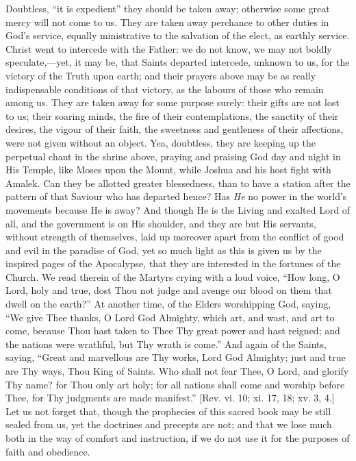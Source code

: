 Doubtless, ``it is expedient'' they should be taken away;
otherwise some great mercy will not come to us. They are taken away
perchance to other duties in God's service, equally ministrative to the
salvation of the elect, as earthly service. Christ went to intercede
with the Father: we do not know, we may not boldly speculate,—yet, it
may be, that Saints departed intercede, unknown to us, for the victory
of the Truth upon earth; and their prayers above may be as really
indispensable conditions of that victory, as the labours of those who
remain among us. They are taken away for some purpose surely: their
gifts are not lost to us; their soaring minds, the fire of their
contemplations, the sanctity of their desires, the vigour of their
faith, the sweetness and gentleness of their affections, were not given
without an object. Yea, doubtless, they are keeping up the perpetual
chant in the shrine above, praying and praising God day and night in His
Temple, like Moses upon the Mount, while Joshua and his host fight with
Amalek. Can they be allotted greater blessedness, than to have a station
after the pattern of that Saviour who has departed hence? Has \emph{He}
no power in the world's movements because He is away? And though He is
the Living and exalted Lord of all, and the government is on His
shoulder, and they are but His servants, without strength of themselves,
laid up moreover apart from the conflict of good and evil in the
paradise of God, yet so much light as this is given us by the inspired
pages of the Apocalypse, that they are interested in the fortunes of the
Church. We read therein of the Martyrs crying with a loud voice,
``How long, O Lord, holy and true, dost Thou not judge and avenge
our blood on them that dwell on the earth?'' At another time, of the
Elders worshipping God, saying, ``We give Thee thanks, O Lord God
Almighty, which art, and wast, and art to come, because Thou hast taken
to Thee Thy great power and hast reigned; and the nations were wrathful,
but Thy wrath is come.'' And again of the Saints, saying,
``Great and marvellous are Thy works, Lord God Almighty; just and
true are Thy ways, Thou King of Saints. Who shall not fear Thee, O Lord,
and glorify Thy name? for Thou only art holy; for all nations shall come
and worship before Thee, for Thy judgments are made manifest.''
[Rev. vi. 10; xi. 17, 18; xv. 3, 4.] Let us not forget that, though the
prophecies of this sacred book may be still sealed from us, yet the
doctrines and precepts are not; and that we lose much both in the way of
comfort and instruction, if we do not use it for the purposes of faith
and obedience.

